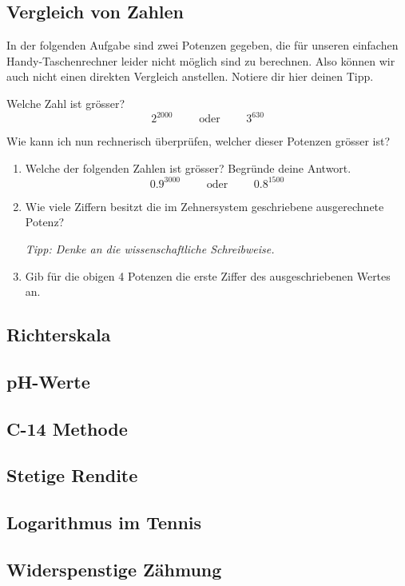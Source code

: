 \documentclass[11pt,oneside]{article}
\begin{document}
\subsection{Vergleich von Zahlen}
	In der folgenden Aufgabe sind zwei Potenzen gegeben, die für unseren einfachen Handy-Taschenrechner leider nicht möglich sind zu berechnen. Also können wir auch nicht einen direkten Vergleich anstellen. Notiere dir hier deinen Tipp.
	\begin{aufgabe}
		Welche Zahl ist grösser? \[2^{2000}\qquad\text{ oder }\qquad 3^{630}\]
	\end{aufgabe}
	Wie kann ich nun rechnerisch überprüfen, welcher dieser Potenzen grösser ist?\vspace{5pt}\\
	\begin{aufgabe}
		\begin{enumerate}[label=\alph*)]
			\item Welche der folgenden Zahlen ist grösser? Begründe deine Antwort. \[0.9^{3000}\qquad\text{ oder }\qquad 0.8^{1500}\]
			\item Wie viele Ziffern besitzt die im Zehnersystem geschriebene ausgerechnete Potenz?
			\begin{itemize}[label=\ ]\end{itemize}
			\footnotesize\textit{Tipp: Denke an die wissenschaftliche Schreibweise.}\normalsize
			\item Gib für die obigen 4 Potenzen die erste Ziffer des ausgeschriebenen Wertes an.
		\end{enumerate}
	\end{aufgabe}


\subsection*{Richterskala}
\subsection*{pH-Werte}
\subsection*{C-14 Methode}
\subsection*{Stetige Rendite}
\subsection*{Logarithmus im Tennis}
\subsection*{Widerspenstige Zähmung}
\endgroup
\end{document}
